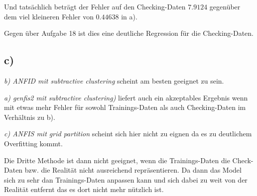 \hfill

Und tatsächlich beträgt der Fehler auf den Checking-Daten $7.9124$ gegenüber dem viel kleineren Fehler von $0.44638$ in a).

Gegen über Aufgabe 18 ist dies eine deutliche Regression für die Checking-Daten. 


\subsection*{c)}

	\textit{b) ANFID mit subtractive clustering} scheint am besten geeignet zu sein.
	
	\textit{a) genfis2 mit subtractive clustering)} liefert auch ein akzeptables Ergebnis wenn mit etwas mehr Fehler für sowohl Trainings-Daten als auch Checking-Daten im Verhältnis zu b).
	
	\textit{c) ANFIS mit grid partition} scheint sich hier nicht zu eignen da es zu deutlichem Overfitting kommt.
	
	\hfill
	
	Die Dritte Methode ist dann nicht geeignet, wenn die Trainings-Daten die Check-Daten bzw. die Realität nicht ausreichend repräsentieren. Da dann das Model sich zu sehr dan Trainings-Daten anpassen kann und sich dabei zu weit von der Realität entfernt das es dort nicht mehr nützlich ist.